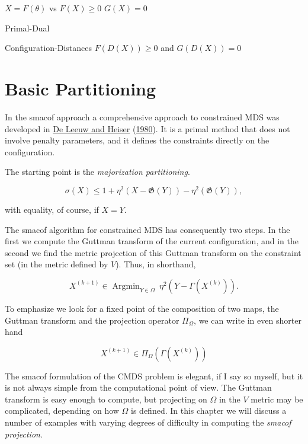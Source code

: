 \documentclass[
  12pt,
]{book}
\theoremstyle{definition}
\theoremstyle{definition}
\theoremstyle{definition}
\theoremstyle{definition}
\theoremstyle{remark}
\begin{document}
\(X=F(\theta)\) vs \(F(X)\geq 0\) \(G(X)=0\)

Primal-Dual

Configuration-Distances \(F(D(X))\geq 0\) and \(G(D(X))=0\)

\hypertarget{baspar}{%
\section{Basic Partitioning}\label{baspar}}

In the smacof approach a comprehensive approach to constrained MDS was developed in \protect\hyperlink{ref-deleeuw_heiser_C_80}{De Leeuw and Heiser} (\protect\hyperlink{ref-deleeuw_heiser_C_80}{1980}). It is a primal method that does not involve penalty parameters, and it defines the constraints directly on the configuration.

The starting point is the \emph{majorization partitioning}.

\begin{equation}
\sigma(X)\leq 1+\eta^2(X-\mathfrak{G}(Y))-\eta^2(\mathfrak{G}(Y)),
\label{eq:smacmdsis}
\end{equation}

with equality, of course, if \(X=Y\).

The smacof algorithm for constrained MDS has consequently two steps. In the first we compute the Guttman transform of the current configuration, and in the second we find the metric projection of this Guttman transform on the constraint set (in the metric defined by \(V\)). Thus, in shorthand,

\begin{equation}
X^{(k+1)}\in\mathop{\text{Argmin}}_{Y\in\Omega}\ \eta^2 (Y-\Gamma(X^{(k)})).
\label{eq:smacmds}
\end{equation}

To emphasize we look for a fixed point of the composition of two maps, the Guttman transform and the projection operator \(\Pi_\Omega\), we can write in even shorter hand

\[
X^{(k+1)}\in\Pi_\Omega(\Gamma(X^{(k)}))
\]

The smacof formulation of the CMDS problem is elegant, if I say so myself, but it is not always simple from the computational point of view. The Guttman transform is easy enough to compute, but projecting on \(\Omega\) in the \(V\) metric may be complicated, depending on how \(\Omega\) is defined. In this chapter we will discuss a number of examples with varying degrees of difficulty in computing the \emph{smacof projection}.
\end{document}
